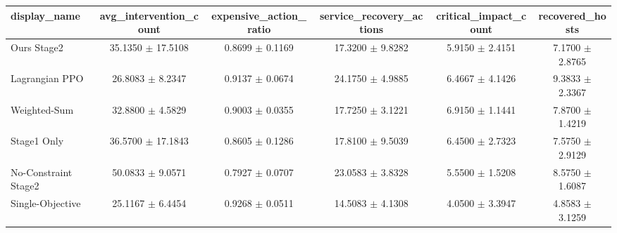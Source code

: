 \begin{tabular}{lccccc}
\hline
display\_name & avg\_intervention\_count & expensive\_action\_ratio & service\_recovery\_actions & critical\_impact\_count & recovered\_hosts \\
\hline
Ours Stage2 & 35.1350 $\pm$ 17.5108 & 0.8699 $\pm$ 0.1169 & 17.3200 $\pm$ 9.8282 & 5.9150 $\pm$ 2.4151 & 7.1700 $\pm$ 2.8765 \\
Lagrangian PPO & 26.8083 $\pm$ 8.2347 & 0.9137 $\pm$ 0.0674 & 24.1750 $\pm$ 4.9885 & 6.4667 $\pm$ 4.1426 & 9.3833 $\pm$ 2.3367 \\
Weighted-Sum & 32.8800 $\pm$ 4.5829 & 0.9003 $\pm$ 0.0355 & 17.7250 $\pm$ 3.1221 & 6.9150 $\pm$ 1.1441 & 7.8700 $\pm$ 1.4219 \\
Stage1 Only & 36.5700 $\pm$ 17.1843 & 0.8605 $\pm$ 0.1286 & 17.8100 $\pm$ 9.5039 & 6.4500 $\pm$ 2.7323 & 7.5750 $\pm$ 2.9129 \\
No-Constraint Stage2 & 50.0833 $\pm$ 9.0571 & 0.7927 $\pm$ 0.0707 & 23.0583 $\pm$ 3.8328 & 5.5500 $\pm$ 1.5208 & 8.5750 $\pm$ 1.6087 \\
Single-Objective & 25.1167 $\pm$ 6.4454 & 0.9268 $\pm$ 0.0511 & 14.5083 $\pm$ 4.1308 & 4.0500 $\pm$ 3.3947 & 4.8583 $\pm$ 3.1259 \\
\hline
\end{tabular}